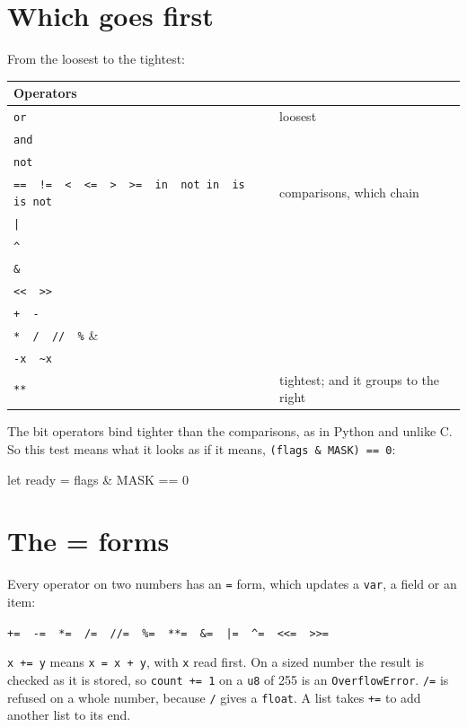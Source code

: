 \section*{Which goes first}

From the loosest to the tightest:

\begin{center}
\begin{tabular}{ll}
\toprule
Operators & \\
\midrule
\verb|or| & loosest \\
\verb|and| & \\
\verb|not| & \\
\verb|==  !=  <  <=  >  >=  in  not in  is  is not| & comparisons, which chain \\
\verb!|! & \\
\verb|^| & \\
\verb|&| & \\
\verb|<<  >>| & \\
\verb|+  -| & \\
\verb|*  /  //  %| & \\
\verb|-x  ~x| & \\
\verb|**| & tightest; and it groups to the right \\
\bottomrule
\end{tabular}
\end{center}

The bit operators bind tighter than the comparisons, as in Python and
unlike C. So this test means what it looks as if it means,
\verb|(flags & MASK) == 0|:

\begin{zenofrag}
let ready = flags & MASK == 0
\end{zenofrag}

\section*{The = forms}

Every operator on two numbers has an \verb|=| form, which updates a
\verb|var|, a field or an item:

\begin{center}
\verb|+=  -=  *=  /=  //=  %=  **=  &=  |\verb!|=!\verb|  ^=  <<=  >>=|
\end{center}

\verb|x += y| means \verb|x = x + y|, with \verb|x| read first. On a
sized number the result is checked as it is stored, so
\verb|count += 1| on a \verb|u8| of 255 is an \verb|OverflowError|.
\verb|/=| is refused on a whole number, because \verb|/| gives a
\verb|float|. A list takes \verb|+=| to add another list to its end.

